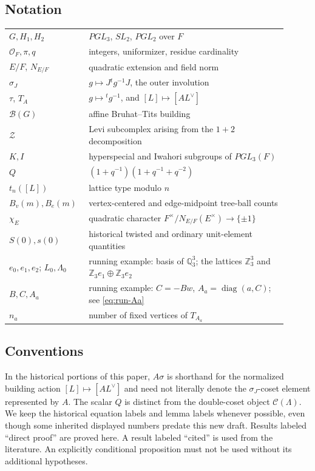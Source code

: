 \documentclass[12pt,letterpaper]{amsart}
\numberwithin{equation}{section}
\theoremstyle{definition}
\theoremstyle{plain}
\begin{document}
\subsection{Notation}
\label{sec:revisit-notation}
\begin{center}
\small
\begin{tabular}{@{}p{0.23\linewidth}p{0.68\linewidth}@{}}
$G,H_1,H_2$ & $PGL_3$, $SL_2$, $PGL_2$ over $F$ \\
$\mathcal O_F,\pi,q$ & integers, uniformizer, residue cardinality \\
$E/F$, $N_{E/F}$ & quadratic extension and field norm \\
$\sigma_J$ & $g\mapsto J{}^tg^{-1}J$, the outer involution \\
$\tau$, $T_A$ & $g\mapsto{}^tg^{-1}$, and $[L]\mapsto[AL^\vee]$ \\
$\mathcal B(G)$ & affine Bruhat--Tits building \\
$\mathcal Z$ & Levi subcomplex arising from the $1+2$ decomposition \\
$K,I$ & hyperspecial and Iwahori subgroups of $PGL_3(F)$ \\
$Q$ & $(1+q^{-1})(1+q^{-1}+q^{-2})$ \\
$t_n([L])$ & lattice type modulo $n$ \\
$B_v(m),B_e(m)$ & vertex-centered and edge-midpoint tree-ball counts \\
$\chi_E$ & quadratic character $F^\times/N_{E/F}(E^\times)\to\{\pm1\}$ \\
$S(0),s(0)$ & historical twisted and ordinary unit-element quantities \\
$e_0,e_1,e_2$; $L_0,\Lambda_0$ & running example: basis of $\mathbb Q_3^3$; the lattices $\mathbb Z_3^3$ and $\mathbb Z_3e_1\oplus\mathbb Z_3e_2$ \\
$B,C,A_a$ & running example: $C=-Bw$, $A_a=\operatorname{diag}(a,C)$; see \eqref{eq:run-Aa} \\
$n_a$ & number of fixed vertices of $T_{A_a}$ \\
\end{tabular}
\end{center}

\subsection{Conventions}
In the historical portions of this paper, $A\sigma$ is shorthand for
the normalized building action $[L]\mapsto[A L^\vee]$ and need not
literally denote the $\sigma_J$-coset element represented by $A$.
The scalar $Q$ is distinct from the double-coset object
$\mathcal C(\Lambda)$. We keep the historical equation labels and
lemma labels whenever possible, even though some inherited displayed
numbers predate this new draft. Results labeled ``direct proof'' are
proved here. A result labeled ``cited'' is used from the literature.
An explicitly conditional proposition must not be used without its
additional hypotheses.
\end{document}
